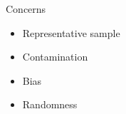 \documentclass[11pt]{beamer}
\begin{document}
\begin{frame}{
	\begin{minipage}[t]{0.55\textwidth}
		Concerns
	\end{minipage}
	\hfill
	\begin{minipage}[t]{0.35\textwidth}
		\flushright
	\end{minipage}
}{}
\begin{itemize}
	\item Representative sample
	\item Contamination
	\item Bias
	\item Randomness
\end{itemize}
\end{frame}
\end{document}
